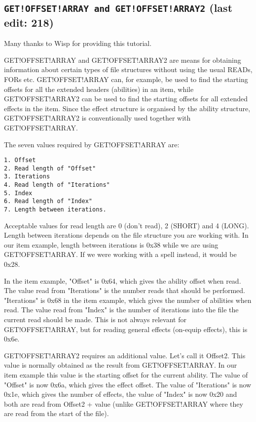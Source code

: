 \documentclass{article}
\def\DEFINE#1{{\tt \bf #1}\label{#1}\index{#1}}
\begin{document}
\subsection{\DEFINE{GET!OFFSET!ARRAY and GET!OFFSET!ARRAY2} (last edit: 218)}

Many thanks to Wisp for providing this tutorial.

GET!OFFSET!ARRAY and GET!OFFSET!ARRAY2 are means for obtaining information about certain types of file structures without using the usual READs, FORs etc. GET!OFFSET!ARRAY can, for example, be used to find the starting offsets for all the extended headers (abilities) in an item, while GET!OFFSET!ARRAY2 can be used to find the starting offsets for all extended effects in the item. Since the effect structure is organised by the ability structure, GET!OFFSET!ARRAY2 is conventionally used together with GET!OFFSET!ARRAY.

The seven values required by GET!OFFSET!ARRAY are:
\begin{verbatim}
1. Offset
2. Read length of "Offset"
3. Iterations
4. Read length of "Iterations"
5. Index
6. Read length of "Index"
7. Length between iterations.
\end{verbatim}

Acceptable values for read length are 0 (don't read), 2 (SHORT) and 4 (LONG). Length between iterations depends on the file structure you are working with. In our item example, length between iterations is 0x38 while we are using GET!OFFSET!ARRAY. If we were working with a spell instead, it would be 0x28.

In the item example, "Offset" is 0x64, which gives the ability offset when read.
The value read from "Iterations" is the number reads that should be performed. "Iterations" is 0x68 in the item example, which gives the number of abilities when read.
The value read from "Index" is the number of iterations into the file the current read should be made. This is not always relevant for GET!OFFSET!ARRAY, but for reading general effects (on-equip effects), this is 0x6e.

GET!OFFSET!ARRAY2 requires an additional value. Let's call it Offset2. This value is normally obtained as the result from GET!OFFSET!ARRAY. In our item example this value is the starting offset for the current ability. The value of "Offset" is now 0x6a, which gives the effect offset. The value of "Iterations" is now 0x1e, which gives the number of effects, the value of "Index" is now 0x20 and both are read from Offset2 + value (unlike GET!OFFSET!ARRAY where they are read from the start of the file).
\end{document}
